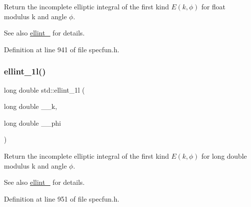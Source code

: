 Return the incomplete elliptic integral of the first kind $ E(k,\phi) $ for {\ttfamily float} modulus {\ttfamily k} and angle $ \phi $.

\begin{DoxySeeAlso}{See also}
\hyperlink{group__mathsf__std_ga1550d6947bbbeee9865aabd398102a36}{ellint\+\_} for details. 
\end{DoxySeeAlso}


Definition at line 941 of file specfun.\+h.

\mbox{\label{group__mathsf__std_ga795383fa51e02351000b410b478d824f}} 
\subsubsection{\texorpdfstring{ellint\+\_\+1l()}{ellint\_1l()}}
{\footnotesize\ttfamily long double std\+::ellint\+\_\+1l (\begin{DoxyParamCaption}\item[{long double}]{\+\_\+\+\_\+k,  }\item[{long double}]{\+\_\+\+\_\+phi }\end{DoxyParamCaption})\hspace{0.3cm}{\ttfamily [inline]}}

Return the incomplete elliptic integral of the first kind $ E(k,\phi) $ for {\ttfamily long double} modulus {\ttfamily k} and angle $ \phi $.

\begin{DoxySeeAlso}{See also}
\hyperlink{group__mathsf__std_ga1550d6947bbbeee9865aabd398102a36}{ellint\+\_} for details. 
\end{DoxySeeAlso}


Definition at line 951 of file specfun.\+h.

\mbox{\label{group__mathsf__std_gad64cb9babb7837d585912b1a94b2cb7d}} 
